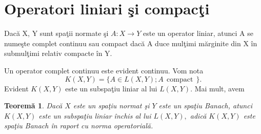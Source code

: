 \documentclass[a4paper,12pt,oneside]{report}
\newtheorem{theorem}{Teorem\u a}
\begin{document}
\section{Operatori liniari \c{s}i compac\c{t}i}

Dac\u{a} X, Y sunt spa\c{t}ii normate \c{s}i  $A: X \rightarrow Y$ este un operator liniar, atunci
A se nume\c{s}te complet continuu sau compact dac\u{a} A duce mul\c{t}imi m\u{a}rginite din X \^{i}n submul\c{t}imi relativ compacte \^{i}n Y.

Un operator complet continuu  este evident continuu.
Vom nota
\[
K(X, Y ) = \{A\in L (X, Y); A~~ \mbox{compact}~~ \}.
\]
Evident $K(X, Y )$ este un subspa\c{t}iu liniar al lui $L(X, Y ).$ Mai mult, avem

\begin{theorem}
Dac\u{a} \(X\) este un spa\c{t}iu normat \c{s}i \(Y\) este un spa\c{t}iu Banach, atunci \(K\left ( X,Y \right )\) este un subspa\c{t}iu liniar \^{i}nchis al lui \(L\left ( X,Y \right ),\) adic\u{a} \(K\left ( X,Y \right )\) este spa\c{t}iu Banach \^{i}n raport cu norma operatorial\u{a}.
\end{theorem}
\end{document}
